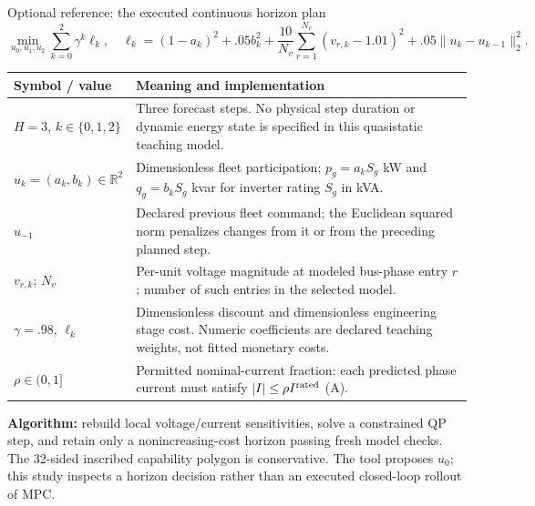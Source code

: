 \begin{frame}[t]{Optional reference: the executed continuous horizon plan}
\[
\min_{u_0,u_1,u_2}\sum_{k=0}^{2}\gamma^k\ell_k,\quad
\ell_k=(1-a_k)^2+.05b_k^2+\frac{10}{N_v}\sum_{r=1}^{N_v}(v_{r,k}-1.01)^2
+.05\|u_k-u_{k-1}\|_2^2.
\]
\begin{tabular}{@{}>{\raggedright\arraybackslash}p{.25\linewidth}>{\raggedright\arraybackslash}p{.68\linewidth}@{}}
\toprule Symbol / value & Meaning and implementation \\
\midrule
$H=3$, $k\in\{0,1,2\}$ & Three forecast steps. No physical step duration or dynamic energy state is specified in this quasistatic teaching model. \\
$u_k=(a_k,b_k)\in\mathbb R^2$ & Dimensionless fleet participation; $p_g=a_kS_g$ kW and $q_g=b_kS_g$ kvar for inverter rating $S_g$ in kVA. \\
$u_{-1}$ & Declared previous fleet command; the Euclidean squared norm penalizes changes from it or from the preceding planned step. \\
$v_{r,k}$; $N_v$ & Per-unit voltage magnitude at modeled bus-phase entry $r$; number of such entries in the selected model. \\
$\gamma=.98$, $\ell_k$ & Dimensionless discount and dimensionless engineering stage cost. Numeric coefficients are declared teaching weights, not fitted monetary costs. \\
$\rho\in(0,1]$ & Permitted nominal-current fraction: each predicted phase current must satisfy $|I|\leq\rho I^{\rm rated}$ (A). \\
\bottomrule
\end{tabular}
\par\smallskip\textbf{Algorithm:} rebuild local voltage/current sensitivities, solve a constrained QP step, and retain only a nonincreasing-cost horizon passing fresh model checks. The 32-sided inscribed capability polygon is conservative. The tool proposes $u_0$; this study inspects a horizon decision rather than an executed closed-loop rollout of MPC.
\end{frame}

